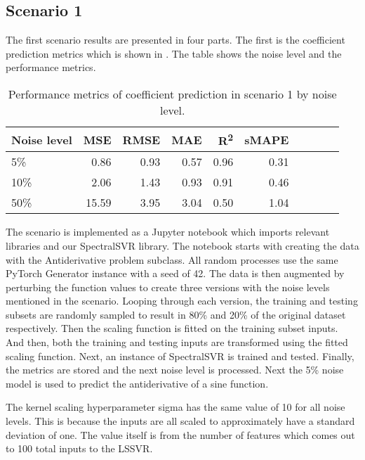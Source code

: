 \subsection{Scenario 1}
\noindent The first scenario results are presented in four parts. The first is the coefficient prediction metrics which is shown in . The table shows the noise level and the performance metrics.
\begin{table}[H]
  \caption{Performance metrics of coefficient prediction in scenario 1 by noise level.}\label{table:scenario_1_spectral_metrics}
  \centering
  \begin{tabular}{lrrrrrrrrr}
    \toprule
    Noise level & MSE   & RMSE & MAE  & R\textsuperscript{2}   & sMAPE \\
    \midrule
    5\%         & 0.86  & 0.93 & 0.57 & 0.96 & 0.31  \\
    10\%        & 2.06  & 1.43 & 0.93 & 0.91 & 0.46  \\
    50\%        & 15.59 & 3.95 & 3.04 & 0.50 & 1.04  \\
    \bottomrule
  \end{tabular}
\end{table}

The scenario is implemented as a Jupyter notebook which imports relevant libraries and our SpectralSVR library. The notebook starts with creating the data with the Antiderivative problem subclass. All random processes use the same PyTorch Generator instance with a seed of 42. The data is then augmented by perturbing the function values to create three versions with the noise levels mentioned in the scenario. Looping through each version, the training and testing subsets are randomly sampled to result in 80\% and 20\% of the original dataset respectively. Then the scaling function is fitted on the training subset inputs. And then, both the training and testing inputs are transformed using the fitted scaling function. Next, an instance of SpectralSVR is trained and tested. Finally, the metrics are stored and the next noise level is processed. Next the 5\% noise model is used to predict the antiderivative of a sine function.

The kernel scaling hyperparameter sigma has the same value of 10 for all noise levels. This is because the inputs are all scaled to approximately have a standard deviation of one. The value itself is from the number of features which comes out to 100 total inputs to the LSSVR\@.

